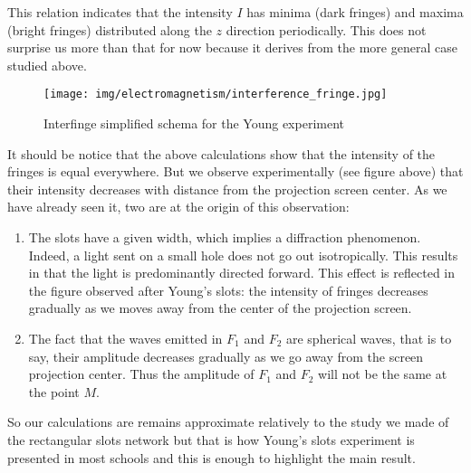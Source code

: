 	This relation indicates that the intensity $I$ has minima (dark fringes) and maxima (bright fringes) distributed along the $z$ direction periodically. This does not surprise us more than that for now because it derives from the more general case studied above.
	\begin{figure}[H]
		\centering
		\texttt{[image: img/electromagnetism/interference\_fringe.jpg]}
		\caption[]{Interfinge simplified schema for the Young experiment}
	\end{figure}
	It should be notice that the above calculations show that the intensity of the fringes is equal everywhere. But we observe experimentally (see figure above) that their intensity decreases with distance from the projection screen center. As we have already seen it, two are at the origin of this observation:
	\begin{enumerate}
		\item The slots have a given width, which implies a diffraction phenomenon. Indeed, a light sent on a small hole does not go out isotropically. This results in that the light is predominantly directed forward. This effect is reflected in the figure observed after Young's slots: the intensity of fringes decreases gradually as we moves away from the center of the projection screen.

		\item The fact that the waves emitted in $F_1$ and $F_2$ are spherical waves, that is to say, their amplitude decreases gradually as we go away from the screen projection center. Thus the amplitude of $F_1$ and $F_2$ will not be the same at the point $M$.
	\end{enumerate}
	So our calculations are remains approximate relatively to the study we made of the rectangular slots network but that is how Young's slots experiment is presented in most schools and this is enough to highlight the main result.
	
